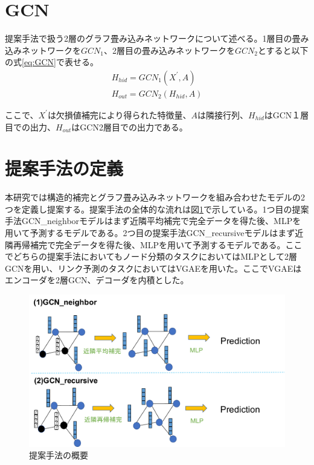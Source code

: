 \section{GCN}
提案手法で扱う2層のグラフ畳み込みネットワークについて述べる。1層目の畳み込みネットワークを$GCN_1$、2層目の畳み込みネットワークを$GCN_2$とすると以下の式\eqref{eq:GCN}で表せる。
\begin{eqnarray} \label{eq:GCN}
H_{hid} = GCN_1(X^{'} ,A)\\
H_{out} = GCN_2(H_{hid} ,A)
\end{eqnarray}

ここで、$X^{'}$は欠損値補完により得られた特徴量、$A$は隣接行列、$H_{hid}$はGCN１層目での出力、$H_{out}$はGCN2層目での出力である。

\section{提案手法の定義}
本研究では構造的補完とグラフ畳み込みネットワークを組み合わせたモデルの2つを定義し提案する。提案手法の全体的な流れは図\ref{fig:proposed_models}で示している。1つ目の提案手法GCN\_neighborモデルはまず近隣平均補完で完全データを得た後、MLPを用いて予測するモデルである。2つ目の提案手法GCN\_recursiveモデルはまず近隣再帰補完で完全データを得た後、MLPを用いて予測するモデルである。ここでどちらの提案手法においてもノード分類のタスクにおいてはMLPとして2層GCNを用い、リンク予測のタスクにおいてはVGAEを用いた。ここでVGAEはエンコーダを2層GCN、デコーダを内積とした。
\begin{figure}[h]
  \centering
  \includegraphics[width=1\hsize]{figures/proposed_architecture.pdf}
  \caption{提案手法の概要}
  \label{fig:proposed_models}
\end{figure}

